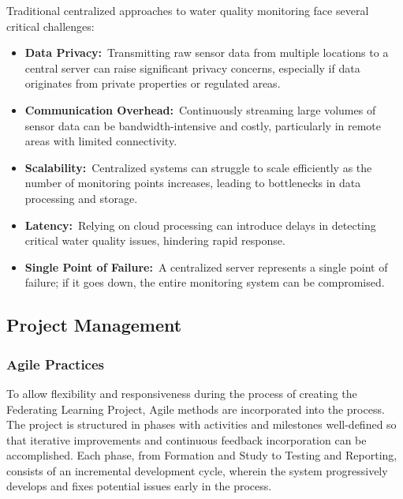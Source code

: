  Traditional centralized approaches to water quality monitoring face several critical challenges:
    \begin{itemize}
        \item \textbf{Data Privacy:} Transmitting raw sensor data from multiple locations to a central server can raise significant privacy concerns, especially if data originates from private properties or regulated areas.
        \item \textbf{Communication Overhead:} Continuously streaming large volumes of sensor data can be bandwidth-intensive and costly, particularly in remote areas with limited connectivity.
        \item \textbf{Scalability:} Centralized systems can struggle to scale efficiently as the number of monitoring points increases, leading to bottlenecks in data processing and storage.
        \item \textbf{Latency:} Relying on cloud processing can introduce delays in detecting critical water quality issues, hindering rapid response.
        \item \textbf{Single Point of Failure:} A centralized server represents a single point of failure; if it goes down, the entire monitoring system can be compromised.
    \end{itemize}



\subsection{Project Management}
\subsubsection{Agile Practices}
To allow flexibility and responsiveness during the process of creating the Federating Learning Project, Agile methods are incorporated into the process. The project is structured in phases with activities and milestones well-defined so that iterative improvements and continuous feedback incorporation can be accomplished. Each phase, from Formation and Study to Testing and Reporting, consists of an incremental development cycle, wherein the system progressively develops and fixes potential issues early in the process.

